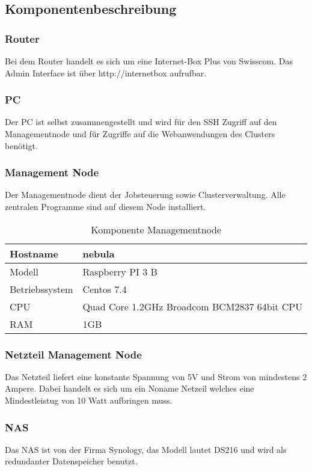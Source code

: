 \subsection{Komponentenbeschreibung}
\subsubsection{Router}

Bei dem Router handelt es sich um eine Internet-Box Plus von Swisscom. Das Admin Interface ist über http://internetbox aufrufbar.

\subsubsection{PC}
Der PC ist selbst zusammengestellt und wird für den SSH Zugriff auf den Managementnode und für Zugriffe auf die Webanwendungen des Clusters benötigt.

\subsubsection{Management Node}
Der Managementnode dient der Jobsteuerung sowie Clusterverwaltung. Alle zentralen Programme sind auf diesem Node installiert.

\begin{table}[H]
\centering
\begin{tabular}{|l|l|}
\hline
Hostname & nebula \\\hline
Modell & Raspberry PI 3 B\\\hline
Betriebssystem & Centos 7.4 \\\hline
CPU & Quad Core 1.2GHz Broadcom BCM2837 64bit CPU \\\hline
RAM & 1GB  \\\hline
\end{tabular}
\caption{Komponente Managementnode}
\end{table}

\subsubsection{Netzteil Management Node}
Das Netzteil liefert eine konstante Spannung von 5V und Strom von mindestens 2 Ampere. Dabei handelt es sich um ein Noname Netzeil welches eine Mindestleistug von 10 Watt aufbringen muss.

\subsubsection{NAS}
Das NAS ist von der Firma Synology, das Modell lautet DS216 und wird als redundanter Datenspeicher benutzt.

